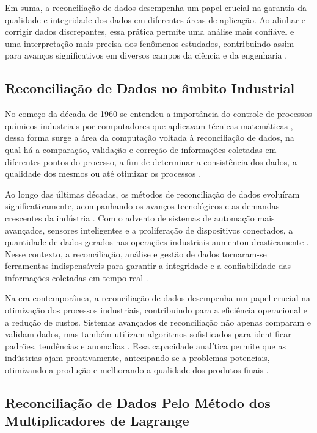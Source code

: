 Em suma, a reconciliação de dados desempenha um papel crucial na garantia da qualidade e integridade dos dados em diferentes áreas de aplicação. Ao alinhar e corrigir dados discrepantes, essa prática permite uma análise mais confiável e uma interpretação mais precisa dos fenômenos estudados, contribuindo assim para avanços significativos em diversos campos da ciência e da engenharia \cite{datarecshakar}.
    
\subsection{Reconciliação de Dados no âmbito Industrial}
    
No começo da década de 1960 se entendeu a importância do controle de processos químicos industriais por computadores que aplicavam técnicas matemáticas \cite{computecontrol}, dessa forma surge a área da computação voltada à reconciliação de dados, na qual há a comparação, validação e correção de informações coletadas em diferentes pontos do processo, a fim de determinar a consistência dos dados, a qualidade dos mesmos ou até otimizar os processos \cite{datarecshakar}.
    
Ao longo das últimas décadas, os métodos de reconciliação de dados evoluíram significativamente, acompanhando os avanços tecnológicos e as demandas crescentes da indústria \cite{datarecsurvey}. Com o advento de sistemas de automação mais avançados, sensores inteligentes e a proliferação de dispositivos conectados, a quantidade de dados gerados nas operações industriais aumentou drasticamente \cite{datarecsurvey}. Nesse contexto, a reconciliação, análise e gestão de dados tornaram-se ferramentas indispensáveis para garantir a integridade e a confiabilidade das informações coletadas em tempo real \cite{aularecon}.
    
Na era contemporânea, a reconciliação de dados desempenha um papel crucial na otimização dos processos industriais, contribuindo para a eficiência operacional e a redução de custos. Sistemas avançados de reconciliação não apenas comparam e validam dados, mas também utilizam algoritmos sofisticados para identificar padrões, tendências e anomalias \cite{datarecragnoli}. Essa capacidade analítica permite que as indústrias ajam proativamente, antecipando-se a problemas potenciais, otimizando a produção e melhorando a qualidade dos produtos finais \cite{datarecshakar}.

\subsection{Reconciliação de Dados Pelo Método dos Multiplicadores de Lagrange}
    
